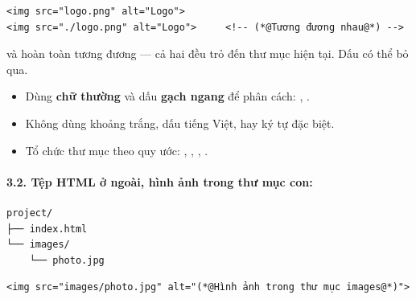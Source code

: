 \begin{codeWindow}
\begin{lstlisting}[language=HTML5]
<img src="logo.png" alt="Logo">
<img src="./logo.png" alt="Logo">     <!-- (*@Tương đương nhau@*) -->
\end{lstlisting}
\end{codeWindow}

\begin{noteBox}
 và  hoàn toàn tương đương — cả hai đều trỏ đến thư mục hiện tại. Dấu  có thể bỏ qua.
\end{noteBox}

\begin{tipBox}
\begin{itemize}[leftmargin=1.5em, itemsep=2pt, parsep=0pt]
    \item Dùng \textbf{chữ thường} và dấu \textbf{gạch ngang} \codeinline{-} để phân cách: , .
    \item Không dùng khoảng trắng, dấu tiếng Việt, hay ký tự đặc biệt.
    \item Tổ chức thư mục theo quy ước: , , , .
\end{itemize}
\end{tipBox}

\paragraph{3.2. Tệp HTML ở ngoài, hình ảnh trong thư mục con:}

\begin{codeWindow}
\begin{lstlisting}[language=HTML5]
project/
├── index.html
└── images/
    └── photo.jpg
\end{lstlisting}
\end{codeWindow}

\begin{codeWindow}
\begin{lstlisting}[language=HTML5]
<img src="images/photo.jpg" alt="(*@Hình ảnh trong thư mục images@*)">
\end{lstlisting}
\end{codeWindow}


